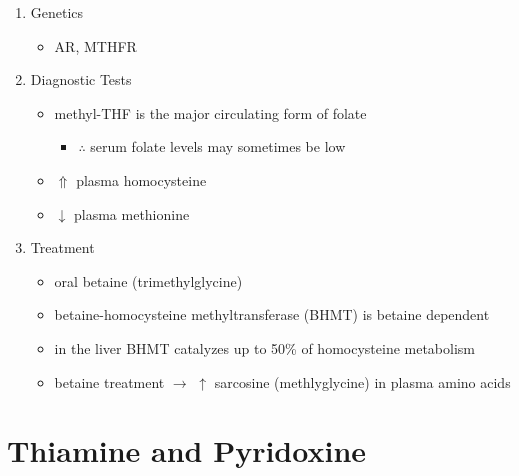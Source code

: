 \documentclass{scrartcl}
\begin{document}
\begin{enumerate}
\item Genetics
\label{sec:org388f9f6}
\begin{itemize}
\item AR, MTHFR
\end{itemize}

\item Diagnostic Tests
\label{sec:org60dc019}
\begin{itemize}
\item methyl-THF is the major circulating form of folate
\begin{itemize}
\item \(\therefore\) serum folate levels may sometimes be low
\end{itemize}
\item \(\Uparrow\) plasma homocysteine
\item \(\downarrow\) plasma methionine
\end{itemize}

\item Treatment
\label{sec:orged0fe95}
\begin{itemize}
\item oral betaine (trimethylglycine)
\item betaine-homocysteine methyltransferase (BHMT) is betaine dependent
\end{itemize}
\begin{itemize}
\item in the liver BHMT catalyzes up to 50\% of homocysteine metabolism
\item betaine treatment \(\to\) \(\uparrow\) sarcosine (methlyglycine) in plasma amino acids
\end{itemize}
\end{enumerate}

\section{Thiamine and Pyridoxine}
\label{sec:org929674e}
\end{document}
